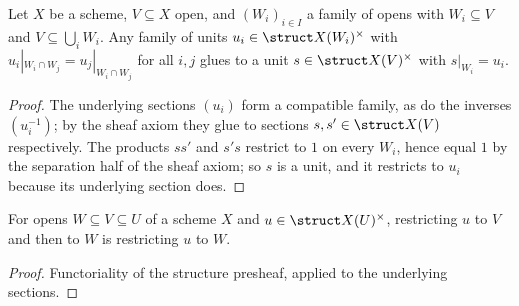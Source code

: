 \begin{lemma}
  \label{pa-lem:units_gluing}
  \leanok

  Let \(X\) be a scheme, \(V \subseteq X\) open, and \((W_i)_{i \in I}\) a family of opens
  with \(W_i \subseteq V\) and \(V \subseteq \bigcup_i W_i\). Any family of units
  \(u_i \in \struct X(W_i)^{\times}\) with \(u_i|_{W_i \cap W_j} = u_j|_{W_i \cap W_j}\) for
  all \(i,j\) glues to a unit \(s \in \struct X(V)^{\times}\) with \(s|_{W_i} = u_i\).
\end{lemma}
\begin{proof}
  \leanok
  The underlying sections \((u_i)\) form a compatible family, as do the inverses
  \((u_i^{-1})\); by the sheaf axiom they glue to sections \(s, s' \in \struct X(V)\)
  respectively. The products \(s s'\) and \(s' s\) restrict to \(1\) on every \(W_i\), hence
  equal \(1\) by the separation half of the sheaf axiom; so \(s\) is a unit, and it restricts
  to \(u_i\) because its underlying section does.
\end{proof}

\begin{lemma}
  \label{pa-lem:unitsRestrict_trans}
  \leanok

  For opens \(W \subseteq V \subseteq U\) of a scheme \(X\) and
  \(u \in \struct X(U)^{\times}\), restricting \(u\) to \(V\) and then to \(W\) is
  restricting \(u\) to \(W\).
\end{lemma}
\begin{proof}
  \leanok
  Functoriality of the structure presheaf, applied to the underlying sections.
\end{proof}

